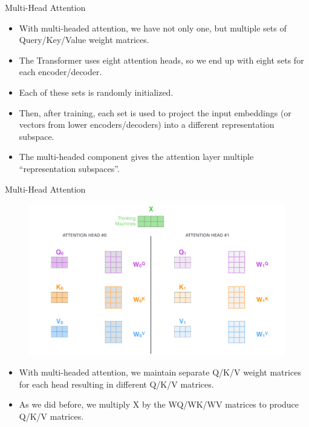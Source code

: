 \documentclass[handout]{beamer}
\begin{document}
\begin{frame}{Multi-Head Attention}
\begin{scriptsize}


\begin{itemize}



\item With multi-headed attention, we have not only one, but multiple sets of Query/Key/Value weight matrices.
\item The Transformer uses eight attention heads, so we end up with eight sets for each encoder/decoder.
\item Each of these sets is randomly initialized.
\item Then, after training, each set is used to project the input embeddings (or vectors from lower encoders/decoders) into a different representation subspace.
 
\item The multi-headed component gives the attention layer multiple ``representation subspaces''. 
 
\end{itemize}

\end{scriptsize}

\end{frame}



\begin{frame}{Multi-Head Attention}

     \begin{figure}[h]
        	\includegraphics[scale = 0.2]{pics/transformer_attention_heads_qkv.png}
        \end{figure}


\begin{scriptsize}
\begin{itemize}
 \item With multi-headed attention, we maintain separate Q/K/V weight matrices for each head resulting in different Q/K/V matrices.
 \item As we did before, we multiply X by the WQ/WK/WV matrices to produce Q/K/V matrices.



\end{itemize}

\end{scriptsize}

\end{frame}
\end{document}
